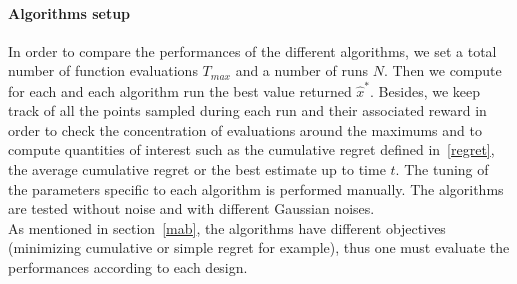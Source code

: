 \documentclass[a4paper,10pt]{article}
\begin{document}
\paragraph{Algorithms setup}
In order to compare the performances of the different algorithms, we set a total number of function evaluations $T_{max}$ and a number of runs $N$. Then we compute for each and each algorithm run the best value returned $\widehat{x}^*$. Besides, we keep track of all the points sampled during each run and their associated reward in order to check the concentration of evaluations around the maximums and to compute quantities of interest such as the cumulative regret defined in~\ref{regret}, the average cumulative regret or the best estimate up to time $t$. The tuning of the parameters specific to each algorithm is performed manually. The algorithms are tested without noise and with different Gaussian noises.\\
As mentioned in section~\ref{mab}, the algorithms have different objectives (minimizing cumulative or simple regret for example), thus one must evaluate the performances according to each design.
\end{document}

